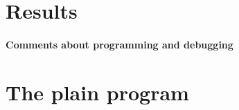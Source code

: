 \section*{Results}

\label{_Commentsaboutprogramminganddebugging}%
\paragraph*{Comments about programming and debugging }

\label{_PlainProg}%
 \section*{The plain program}


\begin{DoxyCodeInclude}
\end{DoxyCodeInclude}
 